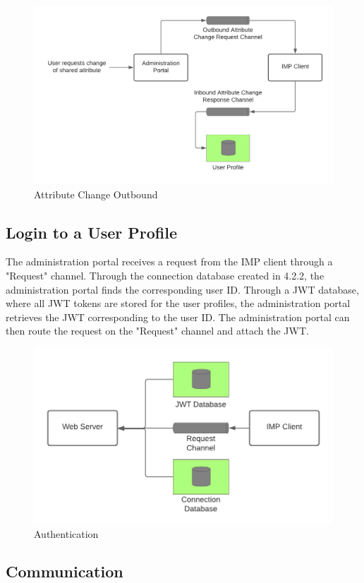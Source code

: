 \begin{figure}[h]
    \centering
    \caption{Attribute Change Outbound}
    \includegraphics[scale=0.3]{Diagrams/Integration Architecture 1/Overview/Attribute Change Web Page.png}
\end{figure}

\subsection{Login to a User Profile}

The administration portal receives a request from the IMP client through a "Request" channel. Through the connection database created in 4.2.2, the administration portal finds the corresponding user ID. Through a JWT database, where all JWT tokens are stored for the user profiles, the administration portal retrieves the JWT corresponding to the user ID. The administration portal can then route the request on the "Request" channel and attach the JWT.

\begin{figure}[h]
    \centering
    \caption{Authentication}
    \includegraphics[scale=0.3]{Diagrams/Integration Architecture 1/Overview/Login.png}
\end{figure}

\subsection{Communication}